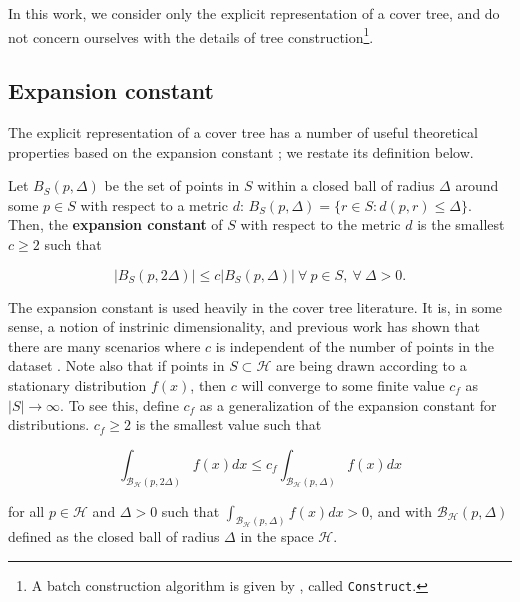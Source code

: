 In this work, we consider only the explicit representation of a cover tree, and
do not concern ourselves with the details of tree construction\footnote{A batch
construction algorithm is given by \citet{langford2006}, called
\texttt{Construct}.}.

\subsection{Expansion constant}

The explicit representation of a cover tree has a number of useful theoretical
properties based on the expansion constant \citep{karger2002finding}; we restate
its definition below.

\begin{defn}
\label{def:int_dim}
Let $B_S(p, \Delta)$ be the set of points in $S$ within a closed ball of radius
$\Delta$ around some $p \in S$ with respect to a metric $d$:
%
$B_S(p, \Delta) = \{ r \in S \colon d(p, r) \leq \Delta \}$.
%
Then, the {\bf expansion constant} of $S$ with respect to the metric $d$ is the
smallest $c \ge 2$ such that

\begin{equation}
| B_S(p, 2 \Delta) | \le c | B_S(p, \Delta) |\ \forall\ p \in S,\
\forall\ \Delta > 0.
\end{equation}

\end{defn}

The expansion constant is used heavily in the cover tree literature.  It is,
in some sense, a notion of instrinic dimensionality, and previous work has shown
that there are many scenarios where $c$ is independent of the number of points
in the dataset \citep{karger2002finding, langford2006,
krauthgamer2004navigating, ram2009}.  Note also that if points in $S \subset
\mathcal{H}$ are being drawn according to a stationary distribution $f(x)$, then
$c$ will converge to some finite value $c_f$ as $|S| \to \infty$.  To see this,
define $c_f$ as a generalization of the expansion constant for distributions.
$c_f \ge 2$ is the smallest value such that

\begin{equation}
\int_{\mathcal{B}_{\mathcal{H}}(p, 2 \Delta)} f(x) dx \le c_{f}
\int_{\mathcal{B}_{\mathcal{H}}(p, \Delta)} f(x)
dx
\end{equation}

\noindent for all $p \in \mathcal{H}$ and $\Delta > 0$ such that
$\int_{\mathcal{B}_{\mathcal{H}}(p, \Delta)} f(x) dx > 0$, and with
$\mathcal{B}_{\mathcal{H}}(p, \Delta)$ defined as the closed ball of radius
$\Delta$ in the space $\mathcal{H}$.

